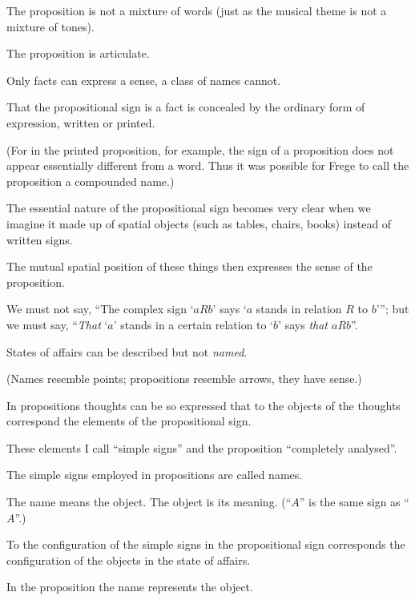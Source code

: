 {The proposition is not a mixture of words
(just as the musical theme is not a mixture of
tones).

The proposition is articulate.}


{Only facts can express a sense, a class of names
cannot.}


{That the propositional sign is a fact is concealed
by the ordinary form of expression, written or
printed.

(For in the printed proposition, for example, the
sign of a proposition does not appear essentially
different from a word. Thus it was possible for
Frege to call the proposition a compounded
name.)}


{The essential nature of the propositional sign
becomes very clear when we imagine it made up
of spatial objects (such as tables, chairs, books)
instead of written signs.

The mutual spatial position of these things then
expresses the sense of the proposition.}


{We must not say, ``The complex sign `$aRb$'
says `$a$ stands in relation $R$ to $b$'{}''; but we must
say, ``\emph{That} `$a$' stands in a certain relation to `$b$'
says \emph{that $aRb$}''.}


{States of affairs can be described but not
\emph{named}.

(Names resemble points; propositions resemble
arrows, they have sense.)}


{In propositions thoughts can be so expressed
that to the objects of the thoughts correspond the
elements of the propositional sign.}


{These elements I call ``simple signs'' and the
proposition ``completely analysed''.}


{The simple signs employed in propositions are
called names.}


{The name means the object. The object is its
meaning. (``$A$'' is the same sign as ``$A$''.)}


{To the configuration of the simple signs in the
propositional sign corresponds the configuration
\enlargethispage{12pt} %
of the objects in the state of affairs.}


{In the proposition the name represents the object.}


